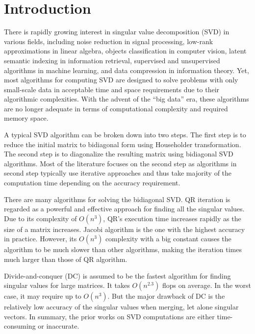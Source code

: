 \section{Introduction}
\label{sec:intro}
There is rapidly growing interest in singular value decomposition (SVD) in various fields,
including noise reduction in signal processing,
low-rank approximations in linear algebra, 
objects classification in computer vision,
latent semantic indexing in information retrieval,
supervised and unsupervised algorithms in machine learning,
and data compression in information theory.
Yet, most algorithms for computing SVD are designed to solve problems
with only small-scale data in acceptable time and space requirements
due to their algorithmic complexities.
With the advent of the ``big data'' era, these algorithms are no longer adequate in terms of computational complexity and required memory space.

A typical SVD algorithm can be broken down into two steps\cite{65SIAM}.
The first step is to reduce the initial matrix to bidiagonal form using Householder transformation.
The second step is to diagonalize the resulting matrix using bidiagonal SVD algorithms.
Most of the literature focuses on the second step as algorithms in second step typically use iterative approaches\cite{58iter1,90iter2,65iter3} and thus take majority of the computation time depending on the accuracy requirement.

There are many algorithms for solving the bidiagonal SVD. 
QR iteration is regarded as a powerful and effective approach
for finding all the singular values.
Due to its complexity of $O(n^3)$, QR's execution time increases rapidly as the size of a matrix increases.
Jacobi algorithm is the one with the highest accuracy in practice\cite{97bookalgebra}.
However, its $O(n^3)$ complexity with a big constant causes the algorithm to be much slower than other algorithms, making the iteration times much larger than those of QR algorithm.

Divide-and-conquer (DC) is assumed to be the fastest algorithm for finding singular values for large matrices\cite{94DCSVD}.
It takes $O(n^{2.3})$ flops on average\cite{97bookalgebra}. 
In the worst case, it may require up to $O(n^3)$.
But the major drawback of DC is the relatively low accuracy of the
singular values when merging, let alone singular vectors. 
In summary, the prior works on SVD computations are either time-consuming or inaccurate.

